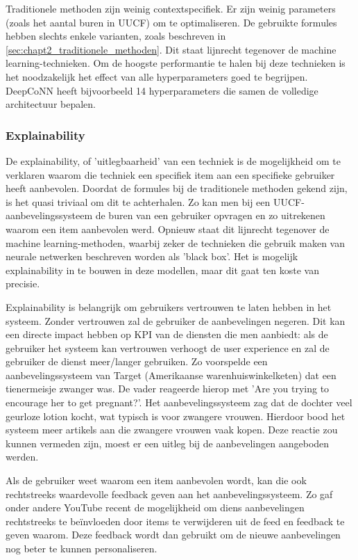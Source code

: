 Traditionele methoden zijn weinig contextspecifiek. Er zijn weinig parameters (zoals het aantal buren in UUCF) om te optimaliseren. De gebruikte formules hebben slechts enkele varianten, zoals beschreven in \autoref{sec:chapt2_traditionele_methoden}. Dit staat lijnrecht tegenover de machine learning-technieken. Om de hoogste performantie te halen bij deze technieken is het noodzakelijk het effect van alle hyperparameters goed te begrijpen. DeepCoNN heeft bijvoorbeeld 14 hyperparameters die samen de volledige architectuur bepalen. \cite{deepconn_github}
\subsubsection{Explainability}
\label{sec:chapt2_explainability}
De explainability, of 'uitlegbaarheid' van een techniek is de mogelijkheid om te verklaren waarom die techniek een specifiek item aan een specifieke gebruiker heeft aanbevolen. Doordat de formules bij de traditionele methoden gekend zijn, is het quasi triviaal om dit te achterhalen. Zo kan men bij een UUCF-aanbevelingssysteem de buren van een gebruiker opvragen en zo uitrekenen waarom een item aanbevolen werd. Opnieuw staat dit lijnrecht tegenover de machine learning-methoden, waarbij zeker de technieken die gebruik maken van neurale netwerken beschreven worden als 'black box'. Het is mogelijk explainability in te bouwen in deze modellen, maar dit gaat ten koste van precisie. \cite{explainable_ai_recsys, explainable_recsys_autoencoders}

Explainability is belangrijk om gebruikers vertrouwen te laten hebben in het systeem. Zonder vertrouwen zal de gebruiker de aanbevelingen negeren. Dit kan een directe impact hebben op KPI van de diensten die men aanbiedt: als de gebruiker het systeem kan vertrouwen verhoogt de user experience en zal de gebruiker de dienst meer/langer gebruiken. Zo voorspelde een aanbevelingssysteem van Target (Amerikaanse warenhuiswinkelketen) dat een tienermeisje zwanger was. De vader reageerde hierop met 'Are you trying to encourage her to get pregnant?'. Het aanbevelingssysteem zag dat de dochter veel geurloze lotion kocht, wat typisch is voor zwangere vrouwen. Hierdoor bood het systeem meer artikels aan die zwangere vrouwen vaak kopen. \cite{recsys_baby_lotion_target} Deze reactie zou kunnen vermeden zijn, moest er een uitleg bij de aanbevelingen aangeboden werden.

Als de gebruiker weet waarom een item aanbevolen wordt, kan die ook rechtstreeks waardevolle feedback geven aan het aanbevelingssysteem. Zo gaf onder andere YouTube recent de mogelijkheid om diens aanbevelingen rechtstreeks te beïnvloeden door items te verwijderen uit de feed en feedback te geven waarom. \cite{youtube_on_recommendations} Deze feedback wordt dan gebruikt om de nieuwe aanbevelingen nog beter te kunnen personaliseren.


